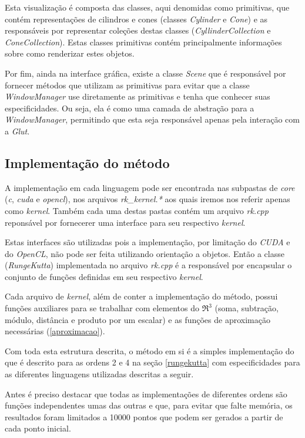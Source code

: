   Esta visualização é composta das classes, aqui denomidas como primitivas, que contém representações de cilindros e cones (classes \textit{Cylinder} e \textit{Cone}) e as responsáveis por representar coleções destas classes (\textit{CyllinderCollection} e \textit{ConeCollection}). Estas classes primitivas contém principalmente informações sobre como renderizar estes objetos.
  
  Por fim, ainda na interface gráfica, existe a classe \textit{Scene} que é responsável por fornecer métodos que utilizam as primitivas para evitar que a classe \textit{WindowManager} use diretamente as primitivas e tenha que conhecer suas especificidades. Ou seja, ela é como uma camada de abstração para a \textit{WindowManager}, permitindo que esta seja responsável apenas pela interação com a \textit{Glut}. 
  
  \subsection{Implementação do método}
  A implementação em cada linguagem pode ser encontrada nas subpastas de \textit{core} (\textit{c}, \textit{cuda} e \textit{opencl}), nos arquivos \textit{rk\_kernel.*} aos quais iremos nos referir apenas como \textit{kernel}. Também cada uma destas pastas contém um arquivo \textit{rk.cpp} reponsável por fornecerer uma interface para seu respectivo \textit{kernel}.
  
  Estas interfaces são utilizadas pois a implementação, por limitação do \textit{CUDA} e do \textit{OpenCL}, não pode ser feita utilizando orientação a objetos. Então a classe (\textit{RungeKutta}) implementada no arquivo \textit{rk.cpp} é a responsável por encapsular o conjunto de funções definidas em seu respectivo \textit{kernel}.

  Cada arquivo de \textit{kernel}, além de conter a implementação do método, possui funções auxiliares para se trabalhar com elementos do $\Re ^{3}$ (soma, subtração, módulo, distância e produto por um escalar) e as funções de aproximação necessárias (\ref{aproximacao}).
  
  Com toda esta estrutura descrita, o método em si é a simples implementação do que é descrito para as ordens 2 e 4 na seção \ref{rungekutta} com especificidades para as diferentes linguagens utilizadas descritas a seguir.
  
  Antes é preciso destacar que todas as implementações de diferentes ordens são funções independentes umas das outras e que, para evitar que falte memória, os resultados foram limitados a 10000 pontos que podem ser gerados a partir de cada ponto inicial.
  
